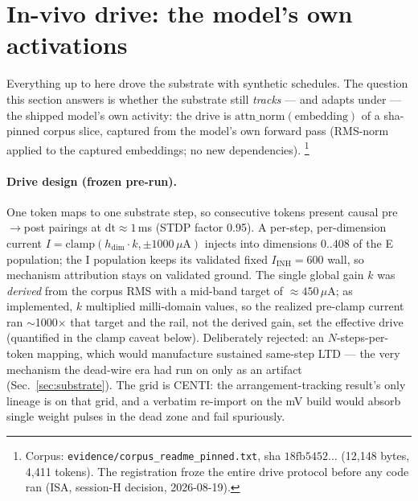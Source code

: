 \section{In-vivo drive: the model's own activations}
\label{sec:invivo}

Everything up to here drove the substrate with synthetic schedules. The
question this section answers is whether the substrate still
\emph{tracks} --- and adapts under --- the shipped model's own activity:
the drive is $\mathrm{attn\_norm}(\mathrm{embedding})$ of a
sha-pinned corpus slice, captured from the model's own forward pass
(RMS-norm applied to the captured embeddings; no new dependencies).%
\footnote{Corpus: \texttt{evidence/corpus\_readme\_pinned.txt}, sha
$18\mathrm{fb}5452\ldots$ (12{,}148 bytes, 4{,}411 tokens). The
registration froze the entire drive protocol before any code ran
(ISA, session-H decision, 2026-08-19).}

\paragraph{Drive design (frozen pre-run).}
One token maps to one substrate step, so consecutive tokens present
causal pre$\to$post pairings at $\mathrm{dt}\approx1$\,ms (STDP factor
0.95). A per-step, per-dimension current
$I = \mathrm{clamp}(h_{\mathrm{dim}} \cdot k, \pm1000\,\mu\mathrm{A})$
injects into dimensions $0..408$ of the E population; the I population
keeps its validated fixed $I_{\mathrm{INH}}=600$ wall, so mechanism
attribution stays on validated ground. The single global gain $k$ was
\emph{derived} from the corpus RMS with a mid-band target of
$\approx450\,\mu$A; as implemented, $k$ multiplied milli-domain values,
so the realized pre-clamp current ran $\sim$1000$\times$ that target and
the rail, not the derived gain, set the effective drive (quantified in
the clamp caveat below). Deliberately rejected: an
$N$-steps-per-token mapping, which would manufacture sustained
same-step LTD --- the very mechanism the dead-wire era had run on only
as an artifact (Sec.~\ref{sec:substrate}). The grid is CENTI: the
arrangement-tracking result's only lineage is on that grid, and a
verbatim re-import on the mV build would absorb single weight pulses in
the dead zone and fail spuriously.


